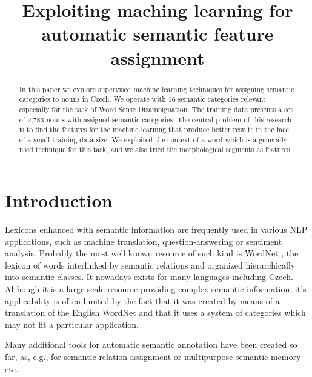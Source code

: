 \documentclass[letterpaper]{article}
\begin{document}
%

\title{Exploiting maching learning for automatic semantic feature assignment}
\maketitle
\begin{abstract}
In this paper we explore supervised machine learning techniques for
assigning semantic categories to nouns in Czech. We operate with 16 semantic categories 
relevant especially for the task of Word Sense Disambiguation. The training
data presents a set of 2,783 nouns with assigned semantic categories.   
The central problem of this research is to find the features for the machine learning 
that produce better results in the face of a small training data size. 
We exploited the context of a word which is a generally used technique for this task, 
and we also tried the morphological segments as features.

\end{abstract}


\section{Introduction}

Lexicons enhanced with semantic information are frequently used 
in various NLP applications, such as machine translation, question-answering
or sentiment analysis. Probably the most well known resource of such kind is 
WordNet \cite{wordnet}, the lexicon of words
interlinked by semantic relations and organized hierarchically into 
semantic classes. It nowadays exists for many languages including Czech. Although it is a large scale resource providing complex semantic information, it's applicability is often limited by the fact that it was created by means of a translation of the English WordNet and that it uses a system of categories which may not fit a particular application.

Many additional tools for automatic semantic annotation have been created so far, as, e.g., 
for semantic relation assignment \cite{peirsman} or multipurpose semantic memory \cite{baroni:2009} etc.  
 
\end{document}
